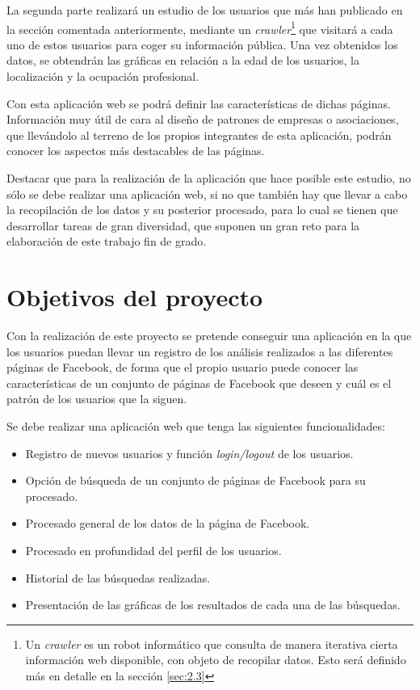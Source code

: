 La segunda parte realizará un estudio de los usuarios que más han publicado en la sección comentada anteriormente, mediante un \textit{crawler}\footnote{Un \textit{crawler} es un robot informático que consulta de manera iterativa cierta información web disponible, con objeto de recopilar datos. Esto será definido más en detalle en la sección \ref{sec:2.3}} que visitará a cada uno de estos usuarios para coger su información pública. Una vez obtenidos los datos, se obtendrán las gráficas en relación a la edad de los usuarios, la localización y la ocupación profesional. 

Con esta aplicación web se podrá definir las características de dichas páginas. Información muy útil de cara al diseño de patrones de empresas o asociaciones, que llevándolo al terreno de los propios integrantes de esta aplicación, podrán conocer los aspectos más destacables de las páginas. 

Destacar que para la realización de la aplicación que hace posible este estudio, no sólo se debe realizar una aplicación web, si no que también hay que llevar a cabo la recopilación de los datos y su posterior procesado, para lo cual se tienen que desarrollar tareas de gran diversidad, que suponen un gran reto para la elaboración de este trabajo fin de grado. 

 
\section{Objetivos del proyecto} \label{sec:1.2}
Con la realización de este proyecto se pretende conseguir una aplicación en la que los usuarios puedan llevar un registro de los análisis realizados a las diferentes páginas de Facebook, de forma que el propio usuario puede conocer las características de un conjunto de  páginas de Facebook que deseen y cuál es el patrón de los usuarios que la siguen. 

Se debe realizar una aplicación web que tenga las siguientes funcionalidades:
\begin{itemize} \itemsep4pt \parskip0pt
\item Registro de nuevos usuarios y función \textit{login/logout} de los usuarios.
\item Opción de búsqueda de un conjunto de páginas de Facebook para su procesado.
\item Procesado general de los datos de la página de Facebook.
\item Procesado en profundidad del perfil de los usuarios.
\item Historial de las búsquedas realizadas. 
\item Presentación de las gráficas de los resultados de cada una de las búsquedas.
\end{itemize}

